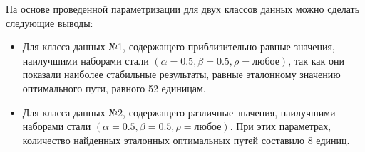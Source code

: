 На основе проведенной параметризации для двух классов данных можно сделать следующие выводы:
\begin{itemize}
    \item Для класса данных №1, содержащего приблизительно равные значения, наилучшими наборами стали $(\alpha = 0.5, \beta = 0.5, \rho = \text{любое})$, так как они показали наиболее стабильные результаты, равные эталонному значению оптимального пути, равного 52 единицам.
    \item Для класса данных №2, содержащего различные значения, наилучшими наборами стали $(\alpha = 0.5, \beta = 0.5, \rho = \text{любое})$. При этих параметрах, количество найденных эталонных оптимальных путей составило 8 единиц.
\end{itemize}